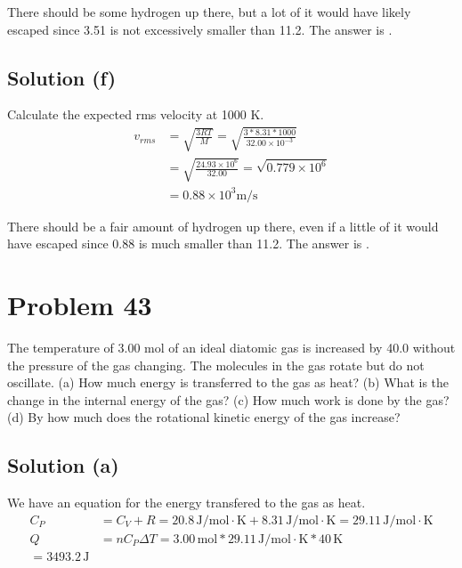 \documentclass[12pt]{article}
\newcommand{\E}[1]{\times 10^{#1}}
\begin{document}
            There should be some hydrogen up there, but a lot of it would have likely escaped since 3.51 is not excessively smaller than 11.2. 
            The answer is .

        \subsection{Solution (f)}
            Calculate the expected rms velocity at 1000 \unit{\kelvin}.
            \begin{align}
                v_{rms} &=  \sqrt{\frac{3RT}{M}}
                    =   \sqrt{\frac{3 * 8.31 * 1000}{32.00\E{-3}}}\\
                    &=  \sqrt{\frac{24.93\E{6}}{32.00}}
                    =   \sqrt{0.779\E{6}}\\
                    &=  0.88\E{3} \unit{\meter/\second}
            \end{align}

            There should be a fair amount of hydrogen up there, even if a little of it would have escaped since 0.88 is much smaller than 11.2. 
            The answer is .

    \pagebreak
    \section{Problem 43}
        The temperature of 3.00 mol of an ideal diatomic gas is increased by 40.0 \unit{\celsiusdegree} without the pressure of the gas changing.
        The molecules in the gas rotate but do not oscillate. 
        (a) How much energy is transferred to the gas as heat? 
        (b) What is the change in the internal energy of the gas? 
        (c) How much work is done by the gas? 
        (d) By how much does the rotational kinetic energy of the gas increase?

        \subsection{Solution (a)}
            We have an equation for the energy transfered to the gas as heat.
            \begin{align}
                C_P &=  C_V + R
                    =   20.8\,\unit{\joule/\mole\cdot\kelvin} + 8.31\,\unit{\joule/\mole\cdot\kelvin}
                    =   29.11\,\unit{\joule/\mole\cdot\kelvin}\\
                Q   &=  nC_P \Delta T
                    =   3.00\,\unit{\mole} * 29.11\,\unit{\joule/\mole\cdot\kelvin} * 40\,\unit{\kelvin}\\
                    =   \boxed{3493.2\,\unit{\joule}}
            \end{align}
\end{document}
